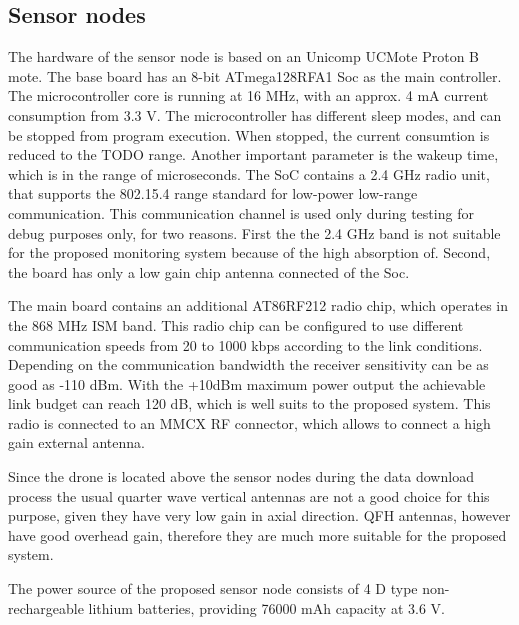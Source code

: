 \documentclass[conference]{IEEEtran}
\begin{document}



\subsection{Sensor nodes}

The hardware of the sensor node is based on an Unicomp UCMote Proton B mote.
The base board has an 8-bit ATmega128RFA1 Soc as the main controller. The
microcontroller core is running at 16 MHz, with an approx. 4 mA current
consumption from 3.3 V. The microcontroller has different sleep modes,
and can be stopped from program execution. When stopped, the current consumtion
is reduced to the TODO range. Another important parameter is the wakeup time,
which is in the range of microseconds. The SoC contains a 2.4 GHz radio unit,
that supports the 802.15.4 range standard for low-power low-range communication.
This communication channel is used only during testing for debug purposes only,
for two reasons. First the the 2.4 GHz band is not suitable for the proposed
monitoring system because of the high absorption of. Second, the board has
only a low gain chip antenna connected of the Soc.

The main board contains an additional AT86RF212 radio chip, which operates in
the 868 MHz ISM band. This radio chip can be configured to use different
communication speeds from 20 to 1000 kbps according to the link conditions.
Depending on the communication bandwidth the receiver sensitivity can be as good as
-110 dBm. With the +10dBm maximum power output the achievable link budget can
reach 120 dB, which is well suits to the proposed system. This radio is connected to
an MMCX RF connector, which allows to connect a high gain external antenna.

Since the drone is located above the sensor nodes during the data download
process the usual quarter wave vertical antennas are not a good choice for
this purpose, given they have very low gain in axial direction. QFH antennas,
however have good overhead gain, therefore they are much more suitable for the
proposed system.

The power source of the proposed sensor node consists of 4 D type non-rechargeable
lithium batteries, providing 76000 mAh capacity at 3.6 V.
\end{document}

